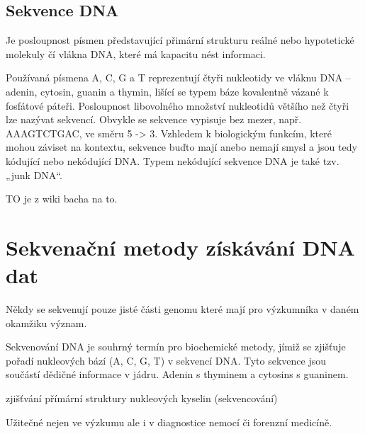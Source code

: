 \documentclass[czech,DP]{thesiskiv}
\begin{document}
\section{Sekvence DNA}
Je posloupnost písmen představující přimární strukturu reálné nebo hypotetické molekuly čí vlákna DNA, které má kapacitu nést informaci.

Používaná písmena A, C, G a T reprezentují čtyři nukleotidy ve vláknu DNA – adenin, cytosin, guanin a thymin, lišící se 
typem báze kovalentně vázané k fosfátové páteři. Posloupnost libovolného množství nukleotidů většího než čtyři lze nazývat 
sekvencí. Obvykle se sekvence vypisuje bez mezer, např. AAAGTCTGAC, ve směru 5 -> 3. Vzhledem k biologickým funkcím, které 
mohou záviset na kontextu, sekvence buďto mají anebo nemají smysl a jsou tedy kódující nebo nekódující DNA. Typem nekódující 
sekvence DNA je také tzv. „junk DNA“.

TO je z wiki bacha na to.


\chapter{Sekvenační metody získávání DNA dat}

Někdy se sekvenují pouze jisté části genomu které mají pro výzkumníka v daném okamžiku význam.

Sekvenování DNA je souhrný termín pro biochemické metody, jímiž se zjišťuje pořadí nukleových bází (A, C, G, T) v sekvencí DNA. Tyto sekvence jsou součástí dědičné informace v jádru.
Adenin s thyminem a cytosins s guaninem.

zjišťvání přímární struktury nukleových kyselin (sekvencování)

Užitečné nejen ve výzkumu ale i v diagnostice nemocí či forenzní medicíně. 
\end{document}
